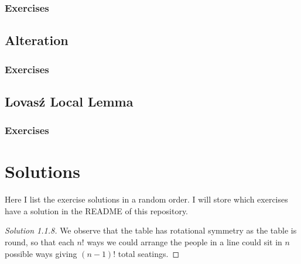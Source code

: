 \documentclass{article}
\begin{document}
\subsubsection*{Exercises}

\newpage

\subsection{Alteration}

\subsubsection*{Exercises}

\newpage

\subsection{Lovas\'{z} Local Lemma}

\subsubsection*{Exercises}

\newpage

\section{Solutions}

Here I list the exercise solutions in a random order. I will store which exercises have a solution in the README of this repository. 

\begin{proof}[Solution 1.1.8]
    We observe that the table has rotational symmetry as the table is round, so that each $n!$ ways we could arrange the people in a line 
    could sit in $n$ possible ways giving $(n-1)!$ total seatings. 
\end{proof}
\end{document}
